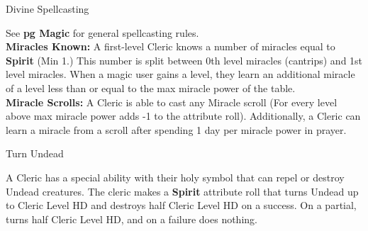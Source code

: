 \begin{multicols}{2}%

\begin{mercHeading}
Divine Spellcasting
\end{mercHeading}

See  \textbf{pg \pageref{section:GenMagicRules} Magic} for general spellcasting rules. \\
\textbf{Miracles Known:} A first-level Cleric knows a number of miracles equal to \textbf{Spirit} (Min 1.) This number is split between 0th level miracles (cantrips) and 1st level miracles. When a magic user gains a level, they learn an additional miracle of a level less than or equal to the max miracle power of the table. \vspace{2pt}\\ 
\textbf{Miracle Scrolls:}
A Cleric is able to cast any Miracle scroll (For every level above max miracle power adds -1 to the attribute roll). Additionally, a Cleric can learn a miracle from a scroll after spending 1 day per miracle power in prayer.

\begin{mercHeading}
Turn Undead
\end{mercHeading}
A Cleric has a special ability with their holy symbol that can repel or destroy Undead creatures. The cleric makes a \textbf{Spirit} attribute roll that turns Undead up to Cleric Level HD and destroys half Cleric Level HD on a success. On a partial, turns half Cleric Level HD, and on a failure does nothing. \\


\end{multicols}
